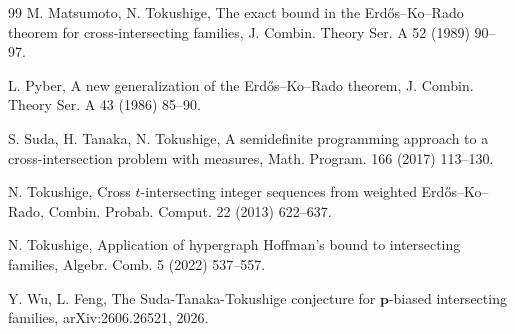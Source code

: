 \documentclass[11pt]{article}
\numberwithin{equation}{section}
\theoremstyle{definition}
\theoremstyle{remark}
\begin{document}
\begin{thebibliography}{99}
M. Matsumoto, N. Tokushige,
The exact bound in the Erd\H{o}s--Ko--Rado theorem for cross-intersecting families,
J. Combin. Theory Ser. A 52 (1989) 90--97.

L. Pyber,
A new generalization of the Erd\H{o}s--Ko--Rado theorem,
J. Combin. Theory Ser. A 43 (1986) 85--90.




S. Suda, H. Tanaka, N. Tokushige,
A semidefinite programming approach to a cross-intersection problem with measures,
Math. Program. 166 (2017) 113--130.

N. Tokushige,
Cross $t$-intersecting integer sequences from weighted Erd\H{o}s--Ko--Rado,
Combin. Probab. Comput. 22 (2013) 622--637.

N. Tokushige,
Application of hypergraph Hoffman's bound to intersecting families,
Algebr. Comb. 5 (2022) 537--557.

Y. Wu, L. Feng,
The Suda-Tanaka-Tokushige conjecture for $\mathbf{p}$-biased intersecting families,
arXiv:2606.26521, 2026.

\end{thebibliography}
\end{document}
